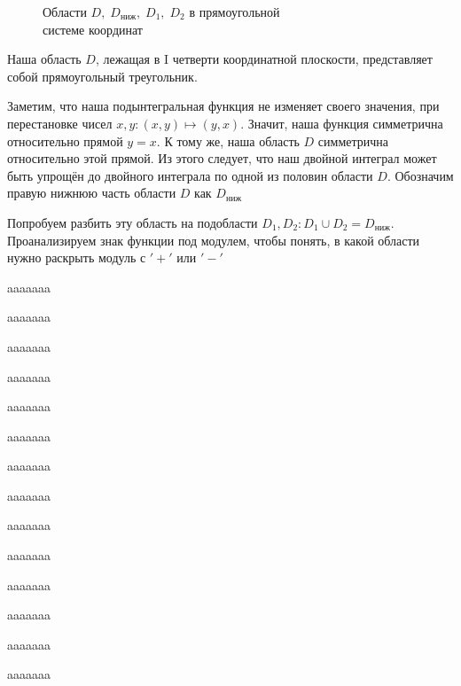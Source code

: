 {\begin{wrapfigure}{l}{0.5\textwidth}
        
        \caption*{Области $D,\;D_\text{ниж},\;D_1,\;D_2$ в прямоугольной\\ системе координат }
    \end{wrapfigure}

    Наша область $D$, лежащая в I четверти координатной плоскости, представляет собой прямоугольный треугольник.
    
    Заметим, что наша подынтегральная функция не изменяет своего значения, при перестановке чисел
    ${x, y\colon(x,y)\mapsto(y,x)}$. Значит, наша функция симметрична относительно прямой $y=x$.
    К тому же, наша область $D$ симметрична относительно этой прямой. Из этого следует, что наш двойной интеграл может быть упрощён до двойного интеграла по одной из половин области $D$. Обозначим правую нижнюю часть области $D$ как $D_\text{ниж}$
    
    \vspace{2mm}
    Попробуем разбить эту область на подобласти $D_1, D_2\colon D_1 \cup D_2 =D_\text{ниж}$. Проанализируем знак функции под модулем, чтобы понять, в какой области нужно раскрыть модуль с $'+'$ или $'-'$

    aaaaaaa

    aaaaaaa
    
    aaaaaaa

    aaaaaaa

    aaaaaaa

    aaaaaaa
    
    aaaaaaa

    aaaaaaa

    aaaaaaa

    aaaaaaa
    
    aaaaaaa

    aaaaaaa

    aaaaaaa

    aaaaaaa
    
}
